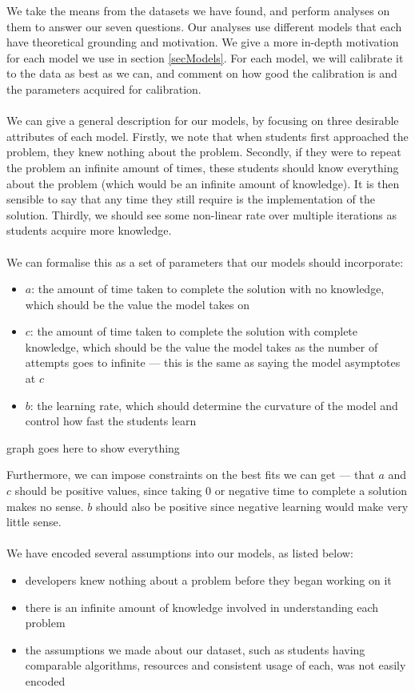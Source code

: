 We take the means from the datasets we have found, and perform analyses on them
to answer our seven questions.
Our analyses use different models that each have theoretical grounding and
motivation.
We give a more in-depth motivation for each model we use in section
\ref{secModels}.
For each model, we will calibrate it to the data as best as we can, and comment
on how good the calibration is and the parameters acquired for calibration.\\
\\
We can give a general description for our models, by focusing on
three desirable attributes of each model.
Firstly, we note that when students first approached the problem, they knew
nothing about the problem.
Secondly, if they were to repeat the problem an infinite amount of times, these students
should know everything about the problem (which would be an infinite amount of
knowledge).
It is then sensible to say that any time they still require is the
implementation of the solution.
Thirdly, we should see some non-linear rate over multiple iterations as students acquire
more knowledge.\\
\\
We can formalise this as a set of parameters that our models should incorporate:
\begin{itemize}
  \item $a$: the amount of time taken to complete the solution with no knowledge,
  which should be the value the model takes on \AZ
  \item $c$: the amount of time taken to complete the solution with complete
  knowledge, which should be the value the model takes as the number of attempts
  goes to infinite --- this is the same as saying the model asymptotes at $c$
  \item $b$: the learning rate, which should determine the curvature of the
  model and control how fast the students learn
\end{itemize}

\FIXME graph goes here to show everything

Furthermore, we can impose constraints on the best fits we can get --- that $a$
and $c$ should be positive values, since taking 0 or negative time to complete a
solution makes no sense.
$b$ should also be positive since negative learning would make very little
sense.\\
\\
We have encoded several assumptions into our models, as listed below:
\begin{itemize}
  \item developers knew nothing about a problem before they began working on it
  \item there is an infinite amount of knowledge involved in understanding each
  problem
  \item the assumptions we made about our dataset, such as students having
  comparable algorithms, resources and consistent usage of each, was not easily
  encoded
\end{itemize}

